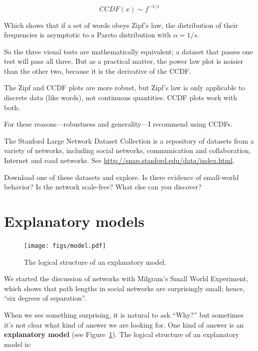 \documentclass[10pt]{book}
\begin{document}
\[ CCDF(x) \sim f^{-{1/s}} \]

Which shows that if a set of words obeys Zipf's law, the
distribution of their frequencies is asymptotic to a
Pareto distribution with $\alpha = 1/s$.

So the three visual tests are mathematically equivalent; a dataset
that passes one test will pass all three.  But as a practical
matter, the power law plot is noisier than the other two, because
it is the derivative of the CCDF.

The Zipf and CCDF plots are more robust, but Zipf's law is only
applicable to discrete data (like words), not continuous quantities.
CCDF plots work with both.

For these reasons---robustness and generality---I recommend
using CCDFs.


\begin{exercise}

The Stanford Large Network Dataset Collection is a repository of
datasets from a variety of networks, including social networks,
communication and collaboration, Internet and road networks.
See \url{http://snap.stanford.edu/data/index.html}.

Download one of these datasets and explore.  Is there evidence
of small-world behavior?  Is the network scale-free?  What else
can you discover?

\end{exercise}


\section{Explanatory models}

\begin{figure}
\centerline{\texttt{[image: figs/model.pdf]}}
\caption{The logical structure of an explanatory model.\label{fig.model}}
\end{figure}

We started the discussion of networks with Milgram's Small World
Experiment, which shows that path lengths in social
networks are surprisingly small; hence, ``six degrees of separation''.

When we see something surprising, it is natural to ask ``Why?''  but
sometimes it's not clear what kind of answer we are looking for.  One
kind of answer is an {\bf explanatory model} (see
Figure~\ref{fig.model}).  The logical structure of an explanatory
model is: 
\end{document}
